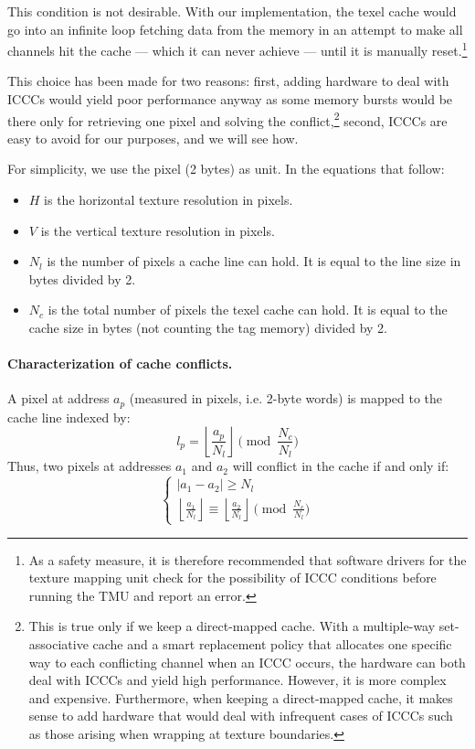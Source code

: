 \documentclass[a4paper,11pt]{kthesis}
\begin{document}
This condition is not desirable. With our implementation, the texel cache would go into an infinite loop fetching data from the memory in an attempt to make all channels hit the cache --- which it can never achieve --- until it is manually reset.\footnote{As a safety measure, it is therefore recommended that software drivers for the texture mapping unit check for the possibility of ICCC conditions before running the TMU and report an error.}

This choice has been made for two reasons: first, adding hardware to deal with ICCCs would yield poor performance anyway as some memory bursts would be there only for retrieving one pixel and solving the conflict,\footnote{This is true only if we keep a direct-mapped cache. With a multiple-way set-associative cache and a smart replacement policy that allocates one specific way to each conflicting channel when an ICCC occurs, the hardware can both deal with ICCCs and yield high performance. However, it is more complex and expensive. Furthermore, when keeping a direct-mapped cache, it makes sense to add hardware that would deal with infrequent cases of ICCCs such as those arising when wrapping at texture boundaries.} second, ICCCs are easy to avoid for our purposes, and we will see how.

For simplicity, we use the pixel (2 bytes) as unit. In the equations that follow:
\begin{itemize}
\item $H$ is the horizontal texture resolution in pixels.
\item $V$ is the vertical texture resolution in pixels.
\item $N_{l}$ is the number of pixels a cache line can hold. It is equal to the line size in bytes divided by 2.
\item $N_{c}$ is the total number of pixels the texel cache can hold. It is equal to the cache size in bytes (not counting the tag memory) divided by 2.
\end{itemize}

\paragraph{Characterization of cache conflicts.} A pixel at address $a_{p}$ (measured in pixels, i.e. 2-byte words) is mapped to the cache line indexed by:
\begin{equation}
l_{p} = \left\lfloor \frac{a_{p}}{N_{l}} \right\rfloor \pmod{\frac{N_{c}}{N_{l}}}
\end{equation}
Thus, two pixels at addresses $a_{1}$ and $a_{2}$ will conflict in the cache if and only if:
\begin{equation}\label{eq:cacheconflict}
\begin{cases}
|a_{1}-a_{2}| \geq N_{l} \\
\left\lfloor \frac{a_{1}}{N_{l}} \right\rfloor \equiv \left\lfloor \frac{a_{2}}{N_{l}} \right\rfloor \pmod{\frac{N_{c}}{N_{l}}}
\end{cases}
\end{equation}
\end{document}
